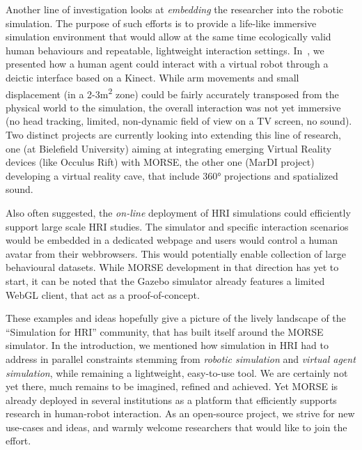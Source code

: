 \documentclass[conference]{IEEEtran}
\begin{document}
Another line of investigation looks at \emph{embedding} the researcher into the
robotic simulation. The purpose of such efforts is to provide a life-like
immersive simulation environment that would allow at the same time ecologically
valid human behaviours and repeatable, lightweight interaction settings.
In~\cite{lemaignan2012morse}, we presented how a human agent could interact with
a virtual robot through a deictic interface based on a Kinect. While arm
movements and small displacement (in a 2-3m\textsuperscript{2} zone) could be
fairly accurately transposed from the physical world to the simulation, the
overall interaction was not yet immersive (no head tracking, limited,
non-dynamic field of view on a TV screen, no sound). Two distinct projects are
currently looking into extending this line of research, one (at Bielefield
University) aiming at integrating emerging Virtual Reality devices (like Occulus
Rift) with MORSE, the other one (MarDI project) developing a virtual reality
cave, that include 360° projections and spatialized sound.

Also often suggested, the \emph{on-line} deployment of HRI simulations could
efficiently support large scale HRI studies. The simulator and specific
interaction scenarios would be embedded in a dedicated webpage and users would
control a human avatar from their webbrowsers. This would potentially enable
collection of large behavioural datasets. While MORSE development in that
direction has yet to start, it can be noted that the Gazebo simulator already
features a limited WebGL client, that act as a proof-of-concept.



These examples and ideas hopefully give a picture of the lively landscape of the
``Simulation for HRI'' community, that has built itself around the MORSE
simulator.  In the introduction, we mentioned how simulation in HRI had to
address in parallel constraints stemming from \emph{robotic simulation} and
\emph{virtual agent simulation}, while remaining a lightweight, easy-to-use
tool. We are certainly not yet there, much remains to be imagined, refined and
achieved.  Yet MORSE is already deployed in several institutions as a platform
that efficiently supports research in human-robot interaction. As an open-source
project, we strive for new use-cases and ideas, and warmly welcome researchers
that would like to join the effort.





\end{document}
